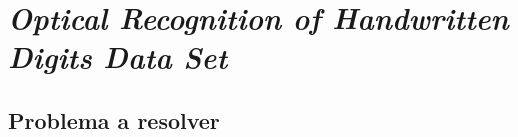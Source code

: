 \documentclass[a4paper, 20pt]{article}
\begin{document}
{\parskip=2pt
  \tableofcontents
}
\pagebreak

\section{\textit{Optical Recognition of Handwritten Digits Data Set}}
\subsection{Problema a resolver}

\end{document}
